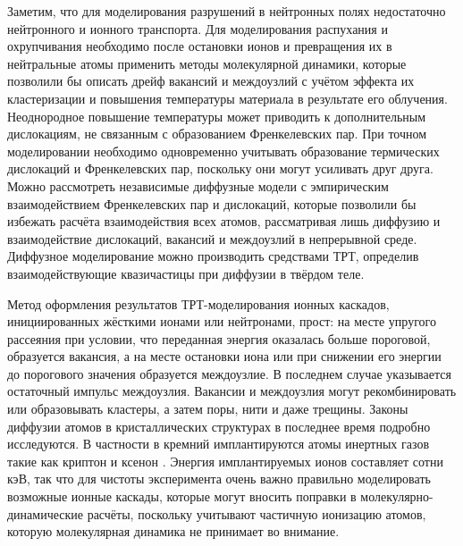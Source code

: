 \documentclass[a4paper,12pt]{article}
\begin{document}
\begin{large}
	Заметим, что для моделирования разрушений в нейтронных полях недостаточно нейтронного и ионного транспорта.
	Для моделирования распухания и охрупчивания необходимо после остановки ионов и превращения их в нейтральные атомы применить методы молекулярной динамики, которые позволили бы описать дрейф вакансий и междоузлий с учётом эффекта их кластеризации и повышения температуры материала в результате его облучения.
	Неоднородное повышение температуры может приводить к дополнительным дислокациям, не связанным с образованием Френкелевских пар.
	При точном моделировании необходимо одновременно учитывать образование термических дислокаций и Френкелевских пар, поскольку они могут усиливать друг друга.
	Можно рассмотреть независимые диффузные модели с эмпирическим взаимодействием Френкелевских пар и дислокаций, которые позволили бы избежать расчёта взаимодействия всех атомов, рассматривая лишь диффузию и взаимодействие дислокаций, вакансий и междоузлий в непрерывной среде.
	Диффузное моделирование можно производить средствами ТРТ, определив взаимодействующие квазичастицы при диффузии в твёрдом теле.
	
	Метод оформления результатов ТРТ-моделирования ионных каскадов, инициированных жёсткими ионами или нейтронами, прост: на месте упругого рассеяния при условии, что переданная энергия оказалась больше пороговой, образуется вакансия, а на месте остановки иона или при снижении его энергии до порогового значения образуется междоузлие.
	В последнем случае указывается остаточный импульс междоузлия.
	Вакансии и междоузлия могут рекомбинировать или образовывать кластеры, а затем поры, нити и даже трещины.
	Законы диффузии атомов в кристаллических структурах в последнее время подробно исследуются.
	В частности в кремний имплантируются атомы инертных газов такие как криптон и ксенон \cite{Fried2015}.
	Энергия имплантируемых ионов составляет сотни кэВ, так что для чистоты эксперимента очень важно правильно моделировать возможные ионные каскады, которые могут вносить поправки в молекулярно-динамические расчёты, поскольку учитывают частичную ионизацию атомов, которую молекулярная динамика не принимает во внимание.


\end{large}
\end{document}
